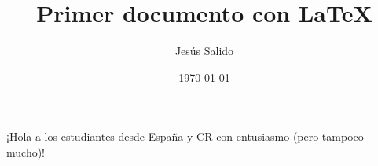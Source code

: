 \documentclass{article}
\title{Primer documento con \LaTeX}
\author{Jesús Salido}
\date{\today}
\begin{document}
\maketitle

¡Hola a los estudiantes desde España y CR con entusiasmo (pero tampoco mucho)!
\end{document}
